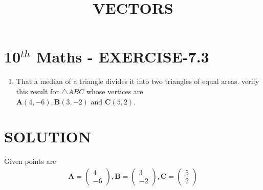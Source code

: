 \documentclass[12pt]{article}
\newcommand{\myvec}[1]{\ensuremath{\begin{pmatrix}#1\end{pmatrix}}}
\let\vec\mathbf
\begin{document}
\begin{center}
\title{\textbf{VECTORS}}
\date{\vspace{-5ex}} %
\maketitle
\end{center}

\section{10$^{th}$ Maths - EXERCISE-7.3}

\begin{enumerate}
\item That a median of a triangle divides it into two triangles  of equal areas. verify this result for $\triangle ABC$ whose vertices are $\vec{A}(4,-6),\vec{B}(3,-2)\text{ and }\vec{C}(5,2)$.
\end{enumerate}

\section{SOLUTION}
Given points are
\begin{align}
\vec{A}=\myvec{4\\ -6} ,
\vec{B}=\myvec{3\\ -2} ,
\vec{C}=\myvec{5\\ 2}
\end{align}
\end{document}
